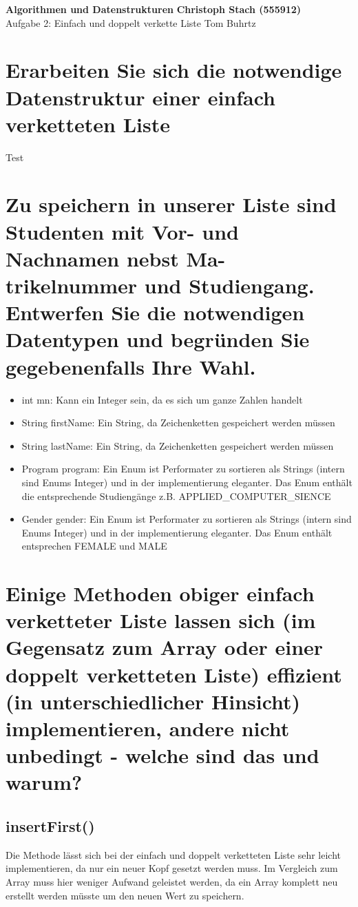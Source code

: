 \documentclass[a4paper, 11pt]{article}
\begin{document}
\noindent
\large\textbf{Algorithmen und Datenstrukturen} \hfill \textbf{Christoph Stach (555912)} \\
\normalsize Aufgabe 2: Einfach und doppelt verkette Liste \hfill Tom Buhrtz \\



\section*{Erarbeiten Sie sich die notwendige Datenstruktur einer einfach verketteten Liste}

Test

\section*{Zu speichern in unserer Liste sind Studenten mit Vor- und Nachnamen nebst Ma-
          trikelnummer und Studiengang. Entwerfen Sie die notwendigen Datentypen und
          begründen Sie gegebenenfalls Ihre Wahl.}

\begin{itemize}
    \item int mn: Kann ein Integer sein, da es sich um ganze Zahlen handelt
    \item String firstName: Ein String, da Zeichenketten gespeichert werden müssen
    \item String lastName: Ein String, da Zeichenketten gespeichert werden müssen
    \item Program program: Ein Enum ist Performater zu sortieren als Strings (intern sind Enums Integer) und in der implementierung eleganter.
Das Enum enthält die entsprechende Studiengänge z.B. APPLIED\_COMPUTER\_SIENCE
    \item Gender gender: Ein Enum ist Performater zu sortieren als Strings (intern sind Enums Integer) und in der implementierung eleganter.
Das Enum enthält entsprechen FEMALE und MALE
\end{itemize}

\section*{Einige Methoden obiger einfach verketteter Liste lassen sich (im Gegensatz zum
          Array oder einer doppelt verketteten Liste) effizient (in unterschiedlicher Hinsicht)
          implementieren, andere nicht unbedingt - welche sind das und warum?}

\subsection*{insertFirst()}
Die Methode lässt sich bei der einfach und doppelt verketteten Liste sehr leicht implementieren, da nur ein neuer Kopf
gesetzt werden muss. Im Vergleich zum Array muss hier weniger Aufwand geleistet werden, da ein Array komplett neu
erstellt werden müsste um den neuen Wert zu speichern.
\end{document}
